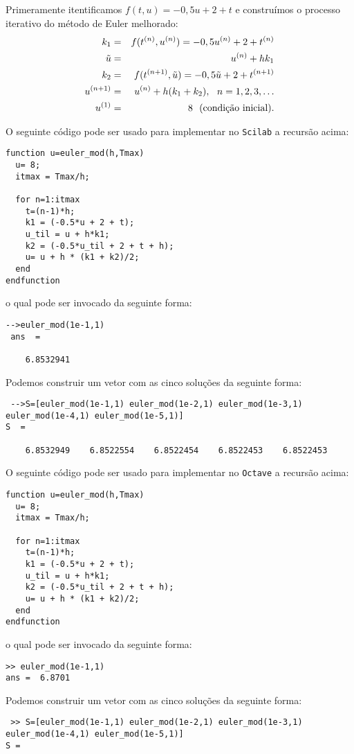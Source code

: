 \begin{resol} Primeramente itentificamos $f(t,u)=-0,5u+2+t$ e construímos o processo iterativo do método de Euler melhorado: 
\begin{eqnarray}
  k_1&=&  f(t^{(n)},u^{(n)})=-0,5u^{(n)}+2+t^{(n)}\\
  \tilde{u}&=& u^{(n)} + hk_1\\
  k_2&=&  f(t^{(n+1)},\tilde{u})=-0,5\tilde{u}+2+t^{(n+1)}\\
  u^{(n+1)}&=&u^{(n)} + h( k_1+k_2),~~n=1,2,3,\ldots\\
  u^{(1)}&=&8 ~~ \hbox{(condição inicial)}.
\end{eqnarray}

\ifisscilab
O seguinte código pode ser usado para implementar no \verb+Scilab+ a recursão acima:
\begin{verbatim}
function u=euler_mod(h,Tmax)
  u= 8;
  itmax = Tmax/h;

  for n=1:itmax
    t=(n-1)*h;
    k1 = (-0.5*u + 2 + t);
    u_til = u + h*k1;
    k2 = (-0.5*u_til + 2 + t + h);
    u= u + h * (k1 + k2)/2;
  end
endfunction
\end{verbatim}
o qual pode ser invocado da seguinte forma:
\begin{verbatim}
-->euler_mod(1e-1,1)
 ans  =
 
    6.8532941 
\end{verbatim}
Podemos construir um vetor com as cinco soluções da seguinte forma:
\begin{verbatim}
 -->S=[euler_mod(1e-1,1) euler_mod(1e-2,1) euler_mod(1e-3,1) euler_mod(1e-4,1) euler_mod(1e-5,1)]
S  =
 
    6.8532949    6.8522554    6.8522454    6.8522453    6.8522453 
 \end{verbatim}

\fi

\ifisoctave
O seguinte código pode ser usado para implementar no \verb+Octave+ a recursão acima:
\begin{verbatim}
function u=euler_mod(h,Tmax)
  u= 8;
  itmax = Tmax/h;

  for n=1:itmax
    t=(n-1)*h;
    k1 = (-0.5*u + 2 + t);
    u_til = u + h*k1;
    k2 = (-0.5*u_til + 2 + t + h);
    u= u + h * (k1 + k2)/2;
  end
endfunction
\end{verbatim}
o qual pode ser invocado da seguinte forma:
\begin{verbatim}
>> euler_mod(1e-1,1)
ans =  6.8701
\end{verbatim}
Podemos construir um vetor com as cinco soluções da seguinte forma:
\begin{verbatim}
 >> S=[euler_mod(1e-1,1) euler_mod(1e-2,1) euler_mod(1e-3,1) euler_mod(1e-4,1) euler_mod(1e-5,1)]
S =


\end{verbatim}
\end{resol}
